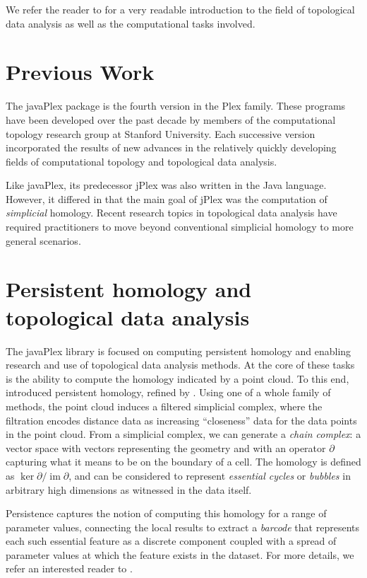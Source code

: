 We refer the reader to \cite{Carlsson_09} for a very readable introduction to the field of topological data analysis as well as the computational tasks involved.

\section{Previous Work}

The javaPlex package is the fourth version in the Plex family. These programs have been developed over the past decade by members of the computational topology research group at Stanford University. Each successive version incorporated the results of new advances in the relatively quickly developing fields of computational topology and topological data analysis.

Like javaPlex, its predecessor jPlex was also written in the Java language. However, it differed in that the main goal of jPlex was the computation of \emph{simplicial} homology. Recent research topics in topological data analysis have required practitioners to move beyond conventional simplicial homology to more general scenarios.

\section{Persistent homology and topological data analysis}
\label{sec:pers-homol-topol}

The javaPlex library is focused on computing persistent homology and
enabling research and use of topological data analysis methods. At the
core of these tasks is the ability to compute the homology indicated
by a point cloud. To this end, \cite{ELZ_02} introduced persistent homology, refined by
\cite{Carlsson_04}. Using one of a whole family of methods, the point
cloud induces a filtered simplicial complex, where the filtration
encodes distance data as increasing ``closeness'' data for the data
points in the point cloud. From a simplicial complex, we can generate
a \emph{chain complex}: a vector space with vectors representing the
geometry and with an operator $\partial$ capturing what it means to be on the
boundary of a cell. The homology is defined as
$\ker\partial/\mathop{\mathrm{im}}\partial$, and can be considered to represent
\emph{essential cycles} or \emph{bubbles} in arbitrary high dimensions
as witnessed in the data itself.

Persistence captures the notion of computing this homology for a range
of parameter values, connecting the local results to extract a
\emph{barcode} that represents each such essential feature as a
discrete component coupled with a spread of parameter values at which
the feature exists in the dataset. For more details, we refer an
interested reader to \cite{Carlsson_09}.


